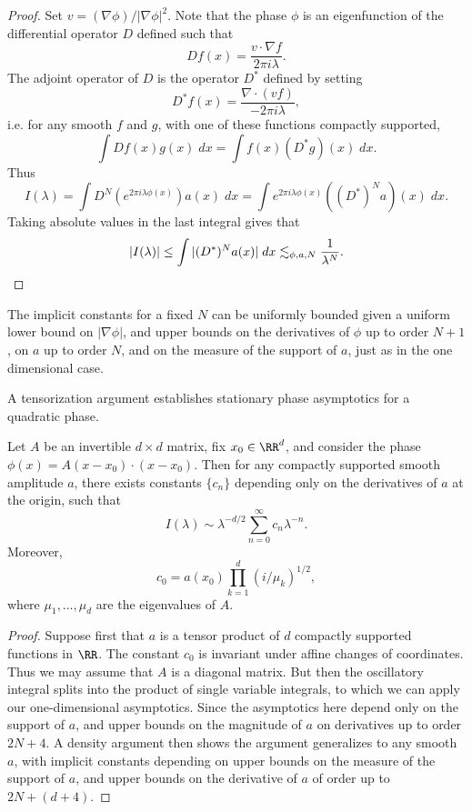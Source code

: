 \begin{proof}
    Set $v = (\nabla \phi)/|\nabla \phi|^2$. Note that the phase $\phi$ is an eigenfunction of the differential operator $D$ defined such that
    \[ Df(x) = \frac{v \cdot \nabla f}{2 \pi i \lambda}. \]
    The adjoint operator of $D$ is the operator $D^*$ defined by setting
    \[ D^*f(x) = \frac{\nabla \cdot (vf)}{-2 \pi i\lambda}, \]
    i.e. for any smooth $f$ and $g$, with one of these functions compactly supported,
    \[ \int Df(x) g(x)\; dx = \int f(x) (D^*g)(x)\; dx. \]
    Thus
    \[ I(\lambda) = \int D^N(e^{2 \pi i \lambda \phi(x)}) a(x)\; dx = \int e^{2 \pi i \lambda \phi(x)} ((D^*)^N a)(x)\; dx. \]
    Taking absolute values in the last integral gives that
    \[ |I(\lambda)| \leq \int |(D^*)^N a(x)|\; dx \lesssim_{\phi,a,N} \frac{1}{\lambda^N}. \qedhere \]
\end{proof}

\begin{remark}
  The implicit constants for a fixed $N$ can be uniformly bounded given a uniform lower bound on $|\nabla \phi|$, and upper bounds on the derivatives of $\phi$ up to order $N+1$, on $a$ up to order $N$, and on the measure of the support of $a$, just as in the one dimensional case.
\end{remark}

A tensorization argument establishes stationary phase asymptotics for a quadratic phase.

\begin{theorem}
  Let $A$ be an invertible $d \times d$ matrix, fix $x_0 \in \RR^d$, and consider the phase $\phi(x) = A(x - x_0) \cdot (x - x_0)$. Then for any compactly supported smooth amplitude $a$, there exists constants $\{ c_n \}$ depending only on the derivatives of $a$ at the origin, such that
  \[ I(\lambda) \sim \lambda^{-d/2} \sum_{n = 0}^\infty c_n \lambda^{-n}. \]
  Moreover,
  \[ c_0 = a(x_0) \prod_{k = 1}^d (i/\mu_k)^{1/2}, \]
  where $\mu_1, \dots, \mu_d$ are the eigenvalues of $A$.
\end{theorem}
\begin{proof}
  Suppose first that $a$ is a tensor product of $d$ compactly supported functions in $\RR$. The constant $c_0$ is invariant under affine changes of coordinates. Thus we may assume that $A$ is a diagonal matrix. But then the oscillatory integral splits into the product of single variable integrals, to which we can apply our one-dimensional asymptotics. Since the asymptotics here depend only on the support of $a$, and upper bounds on the magnitude of $a$ on derivatives up to order $2N + 4$. A density argument then shows the argument generalizes to any smooth $a$, with implicit constants depending on upper bounds on the measure of the support of $a$, and upper bounds on the derivative of $a$ of order up to $2N + (d + 4)$.
\end{proof}


